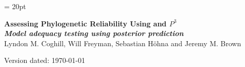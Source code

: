 \documentclass[11pt]{article}
\begin{document}
\renewcommand{\headrulewidth}{0.5pt}
\headsep = 20pt
\lhead{ }

\thispagestyle{plain}
\begin{center}

\textbf{\LARGE Assessing Phylogenetic Reliability Using \RevBayes and $P^{3}$}\\\vspace{2mm}
\textbf{\it{\Large Model adequacy testing using posterior prediction}}\\\vspace{2mm}
\vspace{1cm}
{\Large Lyndon M. Coghill, Will Freyman, Sebastian H{\"o}hna and Jeremy M. Brown}
\vspace{1cm}
\end{center}

\def \ResourcePath {./}
\def \GlobalResourcePath {../}


Version dated: \today
\end{document}
